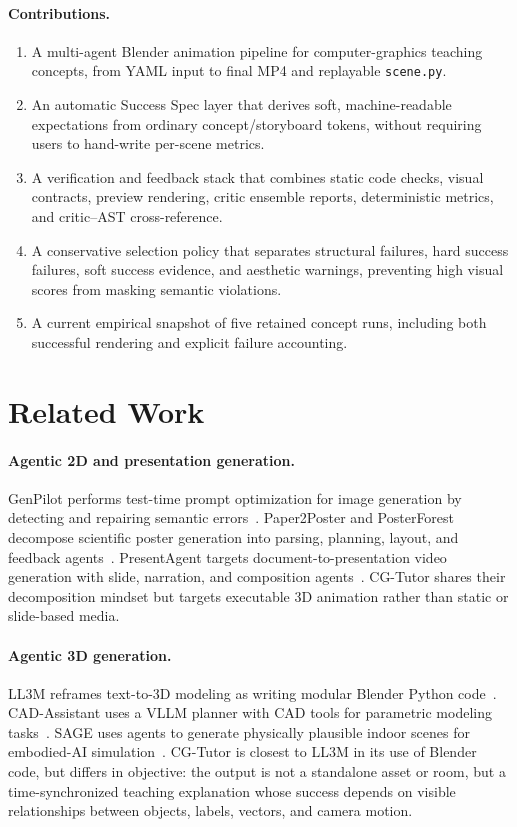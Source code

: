 \documentclass[10pt,letterpaper]{article}
\begin{document}
\paragraph{Contributions.}
\begin{enumerate}[leftmargin=*,topsep=2pt,itemsep=2pt]
  \item A multi-agent Blender animation pipeline for computer-graphics
        teaching concepts, from YAML input to final MP4 and replayable
        \texttt{scene.py}.
  \item An automatic Success Spec layer that derives soft, machine-readable
        expectations from ordinary concept/storyboard tokens, without
        requiring users to hand-write per-scene metrics.
  \item A verification and feedback stack that combines static code checks,
        visual contracts, preview rendering, critic ensemble reports,
        deterministic metrics, and critic--AST cross-reference.
  \item A conservative selection policy that separates structural failures,
        hard success failures, soft success evidence, and aesthetic warnings,
        preventing high visual scores from masking semantic violations.
  \item A current empirical snapshot of five retained concept runs, including
        both successful rendering and explicit failure accounting.
\end{enumerate}

\section{Related Work}

\paragraph{Agentic 2D and presentation generation.}
GenPilot performs test-time prompt optimization for image generation by
detecting and repairing semantic errors~\citep{genpilot2025}. Paper2Poster
and PosterForest decompose scientific poster generation into parsing,
planning, layout, and feedback agents~\citep{paper2poster2025,posterforest2025}.
PresentAgent targets document-to-presentation video generation with slide,
narration, and composition agents~\citep{presentagent2025}. CG-Tutor shares
their decomposition mindset but targets executable 3D animation rather than
static or slide-based media.

\paragraph{Agentic 3D generation.}
LL3M reframes text-to-3D modeling as writing modular Blender Python
code~\citep{ll3m2025}. CAD-Assistant uses a VLLM planner with CAD tools for
parametric modeling tasks~\citep{cadassistant2025}. SAGE uses agents to
generate physically plausible indoor scenes for embodied-AI
simulation~\citep{sage2026}. CG-Tutor is closest to LL3M in its use of
Blender code, but differs in objective: the output is not a standalone
asset or room, but a time-synchronized teaching explanation whose success
depends on visible relationships between objects, labels, vectors, and
camera motion.
\end{document}
